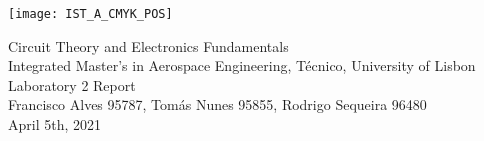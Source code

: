 
\thispagestyle {empty}

\texttt{[image: IST\_A\_CMYK\_POS]}

\begin{center}
%
\vspace{1.0cm}

\vspace{1cm}
{\FontLb Circuit Theory and Electronics Fundamentals} \\ %
\vspace{1cm}
{\FontSn Integrated Master's in Aerospace Engineering, Técnico, University of Lisbon} \\ 
\vspace{1cm}
{\FontSn Laboratory 2 Report} \\ 
\vspace{1cm}
{\FontSn Francisco Alves 95787, Tomás Nunes 95855, Rodrigo Sequeira 96480} \\ 
\vspace{1cm}
{\FontSn April 5th, 2021} 
%
\end{center}

